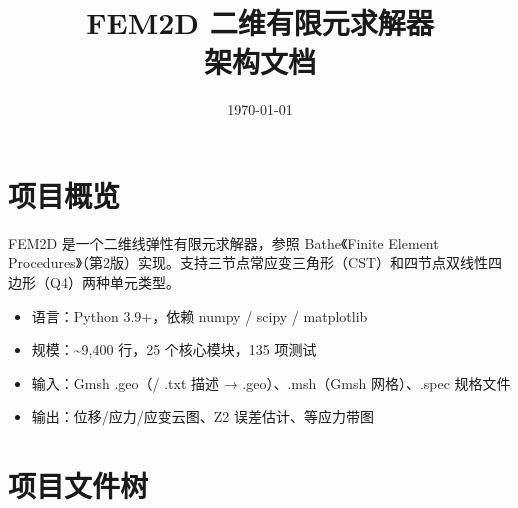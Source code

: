 \documentclass[12pt,a4paper]{ctexart}
\title{\Huge FEM2D 二维有限元求解器\\[4pt]\Large 架构文档}
\author{}
\date{\today}
\begin{document}
\maketitle
\tableofcontents
\newpage

\section{项目概览}

FEM2D 是一个二维线弹性有限元求解器，参照 Bathe《Finite Element Procedures》（第2版）实现。支持三节点常应变三角形（CST）和四节点双线性四边形（Q4）两种单元类型。

\begin{itemize}[leftmargin=*]
  \item 语言：Python 3.9+，依赖 numpy / scipy / matplotlib
  \item 规模：\~{}9,400 行，25 个核心模块，135 项测试
  \item 输入：Gmsh .geo（/ .txt 描述 → .geo）、.msh（Gmsh 网格）、.spec 规格文件
  \item 输出：位移/应力/应变云图、Z2 误差估计、等应力带图
\end{itemize}

\section{项目文件树}
\end{document}
